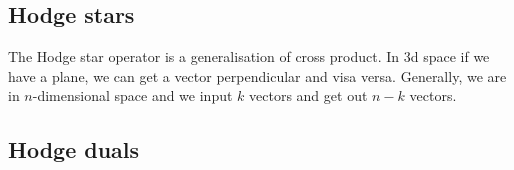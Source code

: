
\subsection{Hodge stars}

The Hodge star operator is a generalisation of cross product.
In 3d space if we have a plane, we can get a vector perpendicular and visa versa.
Generally, we are in \(n\)-dimensional space and we input \(k\) vectors and get out \(n-k\) vectors.

\subsection{Hodge duals}

